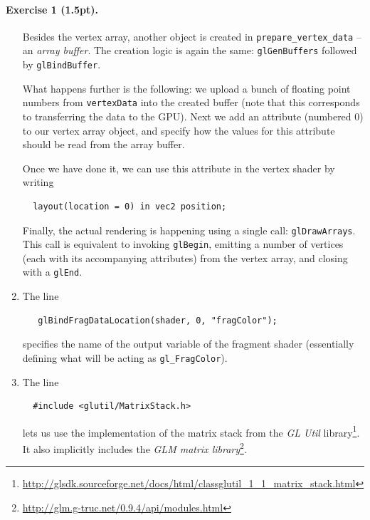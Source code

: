 \documentclass{article}
\newenvironment{exercise}[2]{\paragraph{Exercise #1 (#2pt).} }{
\medskip}
\begin{document}
\begin{exercise}{1}{1.5}
\begin{enumerate}
Besides the vertex array, another object is created in \verb#prepare_vertex_data# -- an \emph{array buffer}. The creation logic is again the same: \texttt{glGenBuffers} followed by \texttt{glBindBuffer}.

What happens further is the following: we upload a bunch of floating point numbers from \texttt{vertexData} into the created buffer (note that this corresponds to transferring the data to the GPU). Next we add an attribute (numbered 0) to our vertex array object, and specify how the values for this attribute should be read from the array buffer.

Once we have done it, we can use this attribute in the vertex shader by writing
\begin{verbatim}
  layout(location = 0) in vec2 position;
\end{verbatim}

Finally, the actual rendering is happening using a single call: \texttt{glDrawArrays}. This call is equivalent to invoking \texttt{glBegin}, emitting a number of vertices (each with its accompanying attributes) from the vertex array, and closing with a \texttt{glEnd}.

\item The line
\begin{verbatim}
   glBindFragDataLocation(shader, 0, "fragColor");
\end{verbatim}
specifies the name of the output variable of the fragment shader (essentially defining what will be acting as \verb#gl_FragColor#).


\item The line 
\begin{verbatim}
  #include <glutil/MatrixStack.h>
\end{verbatim}
lets us use the implementation of the matrix stack from the \emph{GL Util} library\footnote{\url{http://glsdk.sourceforge.net/docs/html/classglutil_1_1_matrix_stack.html}}. It also implicitly includes the \emph{GLM matrix library}\footnote{\url{http://glm.g-truc.net/0.9.4/api/modules.html}}.



\end{enumerate}
\end{exercise}
\end{document}
